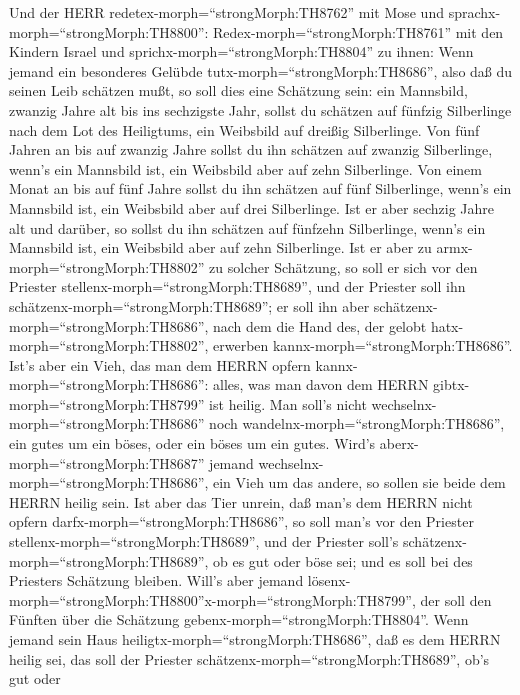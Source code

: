  Und der HERR redetex-morph=``strongMorph:TH8762'' mit Mose
und sprachx-morph=``strongMorph:TH8800'': 
Redex-morph=``strongMorph:TH8761'' mit den Kindern Israel und
sprichx-morph=``strongMorph:TH8804'' zu ihnen: Wenn jemand ein
besonderes Gelübde tutx-morph=``strongMorph:TH8686'', also daß du seinen
Leib schätzen mußt,  so soll dies eine Schätzung sein: ein
Mannsbild, zwanzig Jahre alt bis ins sechzigste Jahr, sollst du schätzen
auf fünfzig Silberlinge nach dem Lot des Heiligtums,  ein
Weibsbild auf dreißig Silberlinge.  Von fünf Jahren an bis
auf zwanzig Jahre sollst du ihn schätzen auf zwanzig Silberlinge, wenn's
ein Mannsbild ist, ein Weibsbild aber auf zehn Silberlinge. 
Von einem Monat an bis auf fünf Jahre sollst du ihn schätzen auf fünf
Silberlinge, wenn's ein Mannsbild ist, ein Weibsbild aber auf drei
Silberlinge.  Ist er aber sechzig Jahre alt und darüber, so
sollst du ihn schätzen auf fünfzehn Silberlinge, wenn's ein Mannsbild
ist, ein Weibsbild aber auf zehn Silberlinge.  Ist er aber
zu armx-morph=``strongMorph:TH8802'' zu solcher Schätzung, so soll er
sich vor den Priester stellenx-morph=``strongMorph:TH8689'', und der
Priester soll ihn schätzenx-morph=``strongMorph:TH8689''; er soll ihn
aber schätzenx-morph=``strongMorph:TH8686'', nach dem die Hand des, der
gelobt hatx-morph=``strongMorph:TH8802'', erwerben
kannx-morph=``strongMorph:TH8686''.  Ist's aber ein Vieh,
das man dem HERRN opfern kannx-morph=``strongMorph:TH8686'': alles, was
man davon dem HERRN gibtx-morph=``strongMorph:TH8799'' ist heilig.
 Man soll's nicht wechselnx-morph=``strongMorph:TH8686''
noch wandelnx-morph=``strongMorph:TH8686'', ein gutes um ein böses, oder
ein böses um ein gutes. Wird's aberx-morph=``strongMorph:TH8687'' jemand
wechselnx-morph=``strongMorph:TH8686'', ein Vieh um das andere, so
sollen sie beide dem HERRN heilig sein.  Ist aber das Tier
unrein, daß man's dem HERRN nicht opfern
darfx-morph=``strongMorph:TH8686'', so soll man's vor den Priester
stellenx-morph=``strongMorph:TH8689'',  und der Priester
soll's schätzenx-morph=``strongMorph:TH8689'', ob es gut oder böse sei;
und es soll bei des Priesters Schätzung bleiben.  Will's
aber jemand
lösenx-morph=``strongMorph:TH8800''x-morph=``strongMorph:TH8799'', der
soll den Fünften über die Schätzung gebenx-morph=``strongMorph:TH8804''.
 Wenn jemand sein Haus
heiligtx-morph=``strongMorph:TH8686'', daß es dem HERRN heilig sei, das
soll der Priester schätzenx-morph=``strongMorph:TH8689'', ob's gut oder
